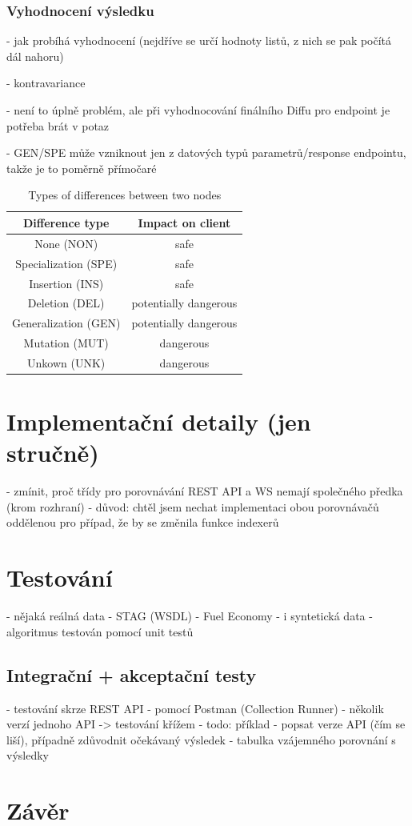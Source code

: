 \documentclass[czech,DP]{thesiskiv}
\begin{document}
\subsection{Vyhodnocení výsledku}

- jak probíhá vyhodnocení (nejdříve se určí hodnoty listů, z nich se pak počítá dál nahoru)

- kontravariance

	- není to úplně problém, ale při vyhodnocování finálního Diffu pro endpoint je potřeba brát v potaz 
	
	- GEN/SPE může vzniknout jen z datových typů parametrů/response endpointu, takže je to poměrně přímočaré

\begin{table}[h!]
	\centering
	\begin{tabular}{c|c}
		Difference type & Impact on client  \\
		\hline
		None (NON) & safe \\
		Specialization (SPE) & safe  \\
		Insertion (INS) & safe \\
		Deletion (DEL) & potentially dangerous \\
		Generalization (GEN) & potentially dangerous \\
		Mutation (MUT) & dangerous \\
		Unkown (UNK) & dangerous
	\end{tabular}
	\caption{Types of differences between two nodes }
	\label{tab:diff-level}
\end{table}

\chapter{Implementační detaily (jen stručně)}

 - zmínit, proč třídy pro porovnávání REST API a WS nemají společného předka (krom rozhraní)
 	- důvod: chtěl jsem nechat implementaci obou porovnávačů oddělenou pro případ, že by se změnila funkce indexerů

\chapter{Testování}

- nějaká reálná data
	- STAG (WSDL)
	- Fuel Economy
- i syntetická data
- algoritmus testován pomocí unit testů

\section{Integrační + akceptační testy}

- testování skrze REST API
- pomocí Postman (Collection Runner)
- několik verzí jednoho API -> testování křížem
- todo: příklad
	- popsat verze API (čím se liší), případně zdůvodnit očekávaný výsledek
	- tabulka vzájemného porovnání s výsledky

\chapter{Závěr}	

 
% 
%

{\raggedright\small

}
\end{document}
